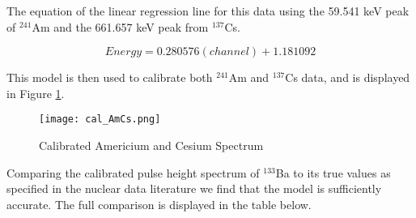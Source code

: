 
The equation of the linear regression line for this data using the 59.541 keV
peak of $^{241}$Am and the  661.657 keV peak from $^{137}$Cs.

\begin{equation}
Energy=0.280576(channel)+1.181092
\end{equation}

This model is then used to calibrate both $^{241}$Am and $^{137}$Cs
data, and is displayed in Figure \ref{fig:fit}.



\begin{figure}[H]
\begin{center}
\texttt{[image: cal\_AmCs.png]}
\caption{Calibrated Americium and Cesium Spectrum \label{fig:fit}}
\end{center}

\end{figure}



Comparing the calibrated pulse height spectrum of $^{133}$Ba
to its true values as specified in the nuclear data literature
we find that the model is sufficiently accurate. The full comparison is
displayed in the table below.

